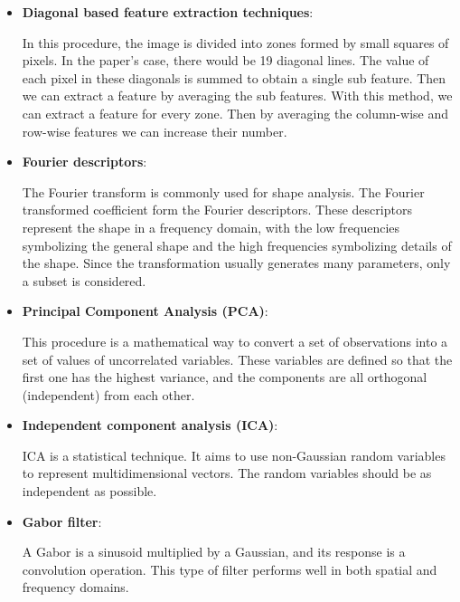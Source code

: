 \documentclass[conference]{IEEEtran}
\begin{document}
					\begin{itemize}
					
						\item \textbf{Diagonal based feature extraction techniques}:
						
							In this procedure, the image is divided into zones formed by small squares of pixels. 
							In the paper's case, there would be 19 diagonal lines. 
							The value of each pixel in these diagonals is summed to obtain a single sub feature. 
							Then we can extract a feature by averaging the sub features. 
							With this method, we can extract a feature for every zone. 
							Then by averaging the column-wise and row-wise features we can increase their number. 
							
						
						\item \textbf{Fourier descriptors}:
						
							The Fourier transform is commonly used for shape analysis. 
							The Fourier transformed coefficient form the Fourier descriptors. 
							These descriptors represent the shape in a frequency domain, with the low frequencies symbolizing the general shape and the high frequencies symbolizing details of the shape. 
							Since the transformation usually generates many parameters, only a subset is considered.
						
						
						\item \textbf{Principal Component Analysis (PCA)}:
						
							This procedure is a mathematical way to convert a set of observations into a set of values of uncorrelated variables. 
							These variables are defined so that the first one has the highest variance, and the components are all orthogonal (independent) from each other. 
							
						\item \textbf{Independent component analysis (ICA)}:
						
							ICA is a statistical technique. 
							It aims to use non-Gaussian random variables to represent multidimensional vectors. 
							The random variables should be as independent as possible. 
						
						\item \textbf{Gabor filter}:
						
							A Gabor is a sinusoid multiplied by a Gaussian, and its response is a convolution operation. 
							This type of filter performs well in both spatial and frequency domains. 
						

\end{itemize}
\end{document}
